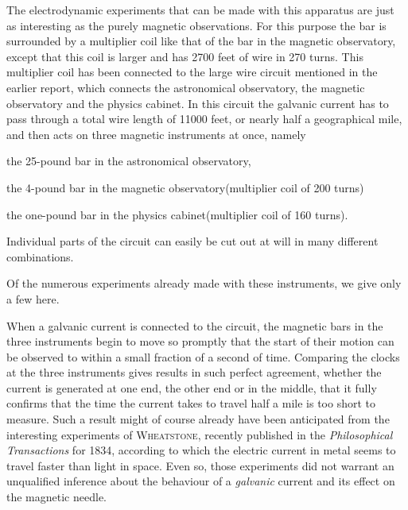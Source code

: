 The electrodynamic experiments that can be made with this apparatus are just as interesting as the purely magnetic observations. For this purpose the bar is surrounded by a multiplier coil like that of the bar in the magnetic observatory, except that this coil is larger and has 2700 feet of wire in 270 turns. This multiplier coil has been connected to the large wire circuit mentioned in the earlier report, which connects the astronomical observatory, the magnetic observatory and the physics cabinet. In this circuit the galvanic current has to pass through a total wire length of 11000 feet, or nearly half a geographical mile, and then acts on three magnetic instruments at once, namely
\begin{list}{}{\setlength{\leftmargin}{2em}\setlength{\labelwidth}{2em}\setlength{\itemsep}{0pt}\setlength{\parsep}{0pt}}
\item[I.] the 25-pound bar in the astronomical observatory,
\item[II.] the 4-pound bar in the magnetic observatory\newline (multiplier coil of 200 turns)
\item[III.] the one-pound bar in the physics cabinet\newline (multiplier coil of 160 turns).
\end{list}
\noindent Individual parts of the circuit can easily be cut out at will in many different combinations.

Of the numerous experiments already made with these instruments, we give only a few here.

When a galvanic current is connected to the circuit, the magnetic bars in the three instruments begin to move so promptly that the start of their motion can be observed to within a small fraction of a second of time. Comparing the clocks at the three instruments gives results in such perfect agreement, whether the current is generated at one end, the other end or in the middle, that it fully confirms that the time the current takes to travel half a mile is too short to measure. Such a result might of course already have been anticipated from the interesting experiments of \textsc{Wheatstone}, recently published in the \textit{Philosophical Transactions} for 1834, according to which the electric current in metal seems to travel faster than light in space. Even so, those experiments did not warrant an unqualified inference about the behaviour of a \textit{galvanic} current and its effect on the magnetic needle.

